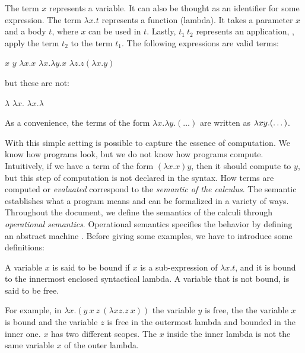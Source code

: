 The term $x$ represents a variable. It can also be thought as an identifier for some expression.
The term $\lambda x.t$ 
represents a function (lambda). It takes a parameter $x$ and a body $t$, where $x$ can be used in 
$t$. Lastly, $t_1\ t_2$ represents an application, \ie{}, apply the term $t_2$ to the term $t_1$. 
The following expressions are valid terms: 
\begin{center}
\hspace{2em} $x$
\hspace{2em} $y$
\hspace{2em} $\lambda x.x$
\hspace{2em} $\lambda x.\lambda y. x$
\hspace{2em} $\lambda z.z(\lambda x. y)$
\end{center}
but these are not:
\begin{center}
\hspace{2em} $\lambda$
\hspace{2em} $\lambda x.$
\hspace{2em} $\lambda x. \lambda$
\end{center}
As a convenience, the terms of the form $\lambda x. \lambda y. (\dots)$ are written as $\lambda xy.(\dots)$.

With this simple setting is possible to capture the essence of computation. We know how programs look, but we do not
know how programs compute. Intuitively, if we have a term of the form $(\lambda x. x) y$, then it should compute 
to $y$, but this step of computation is not declared in the syntax. How  terms are computed or \emph{evaluated}
correspond to the \emph{semantic of the calculus}. The semantic establishes what a program means and can be
formalized in a variety of ways. Throughout the document, we define the semantics of the calculi through 
\emph{operational semantics}. Operational semantics specifies the behavior by defining an abstract machine
\cite{Tapl:2002}. Before giving some examples, we have to introduce some definitions:

\begin{Definition}
\label{def:boundFreeVar}
A variable $x$ is said to be bound if $x$ is a sub-expression of $\lambda x.t$, and it is bound
to the innermost enclosed syntactical lambda. A variable that is not bound, is said to be free.
\end{Definition}
For example, in $\lambda x.(y\ x\ z\ (\lambda xz.z\ x))$ the variable $y$ is free, the the variable $x$ 
is bound and the variable $z$ is free in the outermost lambda and bounded in the inner one.
$x$ has two different scopes. The $x$ inside the inner lambda is not the same 
variable $x$ of the outer lambda.

